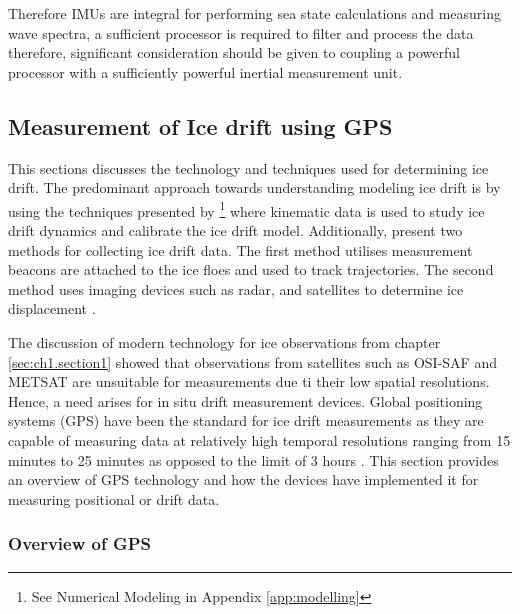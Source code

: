 Therefore IMUs are integral for performing sea state calculations and measuring wave spectra, a sufficient processor is required to filter and process the data therefore, significant consideration should be given to coupling a powerful processor with a sufficiently powerful inertial measurement unit.

\subsection{Measurement of Ice drift using GPS}
\label{sec:ch2_drift}

This sections discusses the technology and techniques used for determining ice drift. The predominant approach towards understanding modeling ice drift is by using the techniques presented by \textcite{hibler1979dynamic}\footnote{See Numerical Modeling in Appendix \ref{app:modelling}} where kinematic data is used to study ice drift dynamics and calibrate the ice drift model. Additionally, \textcite{lepparanta2001sea} present two methods for collecting ice drift data. The first method utilises measurement beacons are attached to the ice floes and used to track trajectories. The second method uses imaging devices such as radar, and satellites to determine ice displacement \cite{lepparanta2001sea}.\par

The discussion of modern technology for ice observations from chapter \ref{sec:ch1.section1} showed that observations from satellites such as OSI-SAF and METSAT are unsuitable for measurements \cite{lepparanta2001sea,galin2011validation} due ti their low spatial resolutions. Hence, a need arises for in situ drift measurement devices. Global positioning systems (GPS) have been the standard for ice drift measurements \cite{lepparanta2001sea} as they are capable of measuring data at relatively high temporal resolutions ranging from 15 minutes \cite{alberello2019drift} to 25 minutes \cite{rabault2019open} as opposed to the limit of 3 hours \cite{alberello2019drift}. This section provides an overview of GPS technology and how the devices have implemented it for measuring positional or drift data.

\subsubsection{Overview of GPS}


